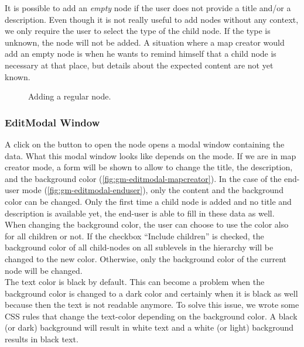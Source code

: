 It is possible to add an \textit{empty} node if the user does not provide a title and/or a description. Even though it is not really useful to add nodes without any context, we only require the user to select the type of the child node. If the type is unknown, the node will not be added. A situation where a map creator would add an empty node is when he wants to remind himself that a child node is necessary at that place, but details about the expected content are not yet known.\\

\begin{figure}[H]
	\centering
	\caption{Adding a regular node.}
	\label{fig:gm-add-regular}
\end{figure}



\subsubsection{EditModal Window}\label{sec:editmodal}
A click on the button to open the node opens a modal window containing the data. What this modal window looks like depends on the mode. If we are in map creator mode, a form will be shown to allow to change the title, the description, and the background color (\autoref{fig:gm-editmodal-mapcreator}). In the case of the end-user mode (\autoref{fig:gm-editmodal-enduser}), only the content and the background color can be changed. Only the first time a child node is added and no title and description is available yet, the end-user is able to fill in these data as well.\\

When changing the background color, the user can choose to use the color also for all children or not. If the checkbox ``Include children'' is checked, the background color of all child-nodes on all sublevels in the hierarchy will be changed to the new color. Otherwise, only the background color of the current node will be changed.\\

The text color is black by default. This can become a problem when the background color is changed to a dark color and certainly when it is black as well because then the text is not readable anymore. To solve this issue, we wrote some CSS rules that change the text-color depending on the background color. A black (or dark) background will result in white text and a white (or light) background results in black text.\\

